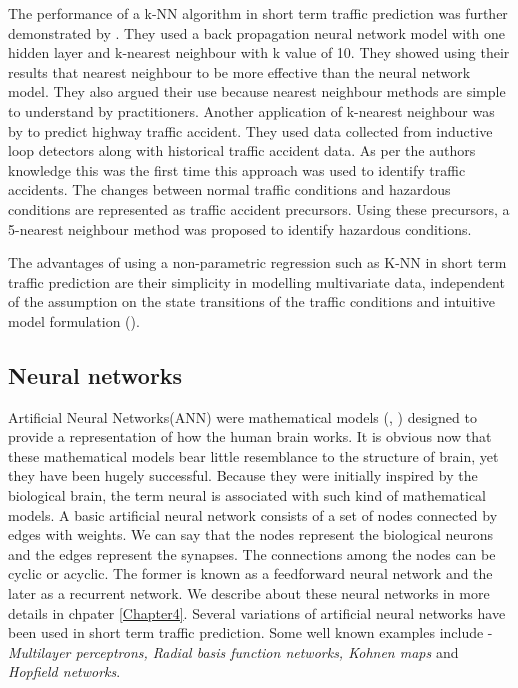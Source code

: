 The performance of a k-NN algorithm in short term traffic prediction was further demonstrated by
\citet{smith1994comparison}. They used a back propagation neural network model with one hidden layer
and k-nearest neighbour with k value of 10. They showed using their results that nearest neighbour
to be more effective than the neural network model. They also argued their use because nearest
neighbour methods are simple to understand by practitioners. Another application of k-nearest neighbour
was by \citet{lv2009real} to predict highway traffic accident. They used data collected from
inductive loop detectors along with historical traffic accident data. As per the authors knowledge
this was the first time this approach was used to identify traffic accidents. The changes between
normal traffic conditions and hazardous conditions are represented as traffic accident precursors.
Using these precursors, a 5-nearest neighbour method was proposed to identify hazardous conditions.

The advantages of using a non-parametric regression such as K-NN in short term traffic prediction
are their simplicity in modelling multivariate data, independent of the assumption on the state
transitions of the traffic conditions and intuitive model formulation (\citet{vlahogianni2004short}).

\subsection{Neural networks}
\label{subsec:neuralNetworksTrafficPred}
Artificial Neural Networks(ANN) were mathematical models (\citet{mcculloch1943logical},
\citet{rosenblatt1958perceptron}) designed to  provide a representation of how the human brain
works. It is obvious now that these mathematical models bear little resemblance to the structure
of brain, yet they have been hugely successful. Because they were initially inspired by the
biological brain, the term neural is associated with such kind of mathematical models. A basic
artificial neural network consists of a set of nodes connected by edges with weights. We can say
that the nodes represent the biological neurons and the edges represent the synapses. The
connections among the nodes can be cyclic or acyclic. The former is known as a feedforward neural
network and the later as a recurrent network. We describe about these neural networks in more
details in chpater \ref{Chapter4}. Several variations of artificial neural networks have been
used in short term traffic prediction. Some well known examples include - \textit{Multilayer
perceptrons, Radial basis function networks, Kohnen maps} and \textit{Hopfield networks}.

